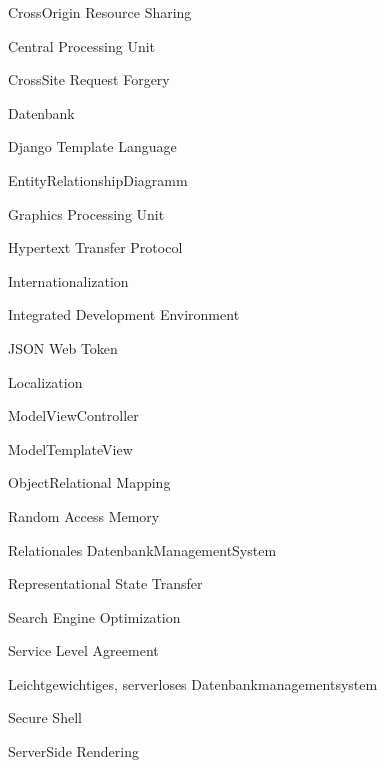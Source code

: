 \documentclass[a4paper,12pt,ngerman]{sphinxmanual}
\begin{document}
\sphinxAtStartPar
{}
Cross\sphinxhyphen{}Origin Resource Sharing

\sphinxAtStartPar
{}
Central Processing Unit

\sphinxAtStartPar
{}
Cross\sphinxhyphen{}Site Request Forgery

\sphinxAtStartPar
{}
Datenbank

\sphinxAtStartPar
{}
Django Template Language

\sphinxAtStartPar
{}
Entity\sphinxhyphen{}Relationship\sphinxhyphen{}Diagramm

\sphinxAtStartPar
{}
Graphics Processing Unit

\sphinxAtStartPar
{}
Hypertext Transfer Protocol

\sphinxAtStartPar
{}
Internationalization

\sphinxAtStartPar
{}
Integrated Development Environment

\sphinxAtStartPar
{}
JSON Web Token

\sphinxAtStartPar
{}
Localization

\sphinxAtStartPar
{}
Model\sphinxhyphen{}View\sphinxhyphen{}Controller

\sphinxAtStartPar
{}
Model\sphinxhyphen{}Template\sphinxhyphen{}View

\sphinxAtStartPar
{}
Object\sphinxhyphen{}Relational Mapping

\sphinxAtStartPar
{}
Random Access Memory

\sphinxAtStartPar
{}
Relationales Datenbank\sphinxhyphen{}Management\sphinxhyphen{}System

\sphinxAtStartPar
{}
Representational State Transfer

\sphinxAtStartPar
{}
Search Engine Optimization

\sphinxAtStartPar
{}
Service Level Agreement

\sphinxAtStartPar
{}
Leichtgewichtiges, serverloses Datenbankmanagementsystem

\sphinxAtStartPar
{}
Secure Shell

\sphinxAtStartPar
{}
Server\sphinxhyphen{}Side Rendering
\end{document}
